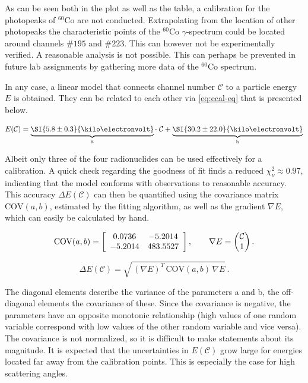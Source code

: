 

As can be seen both in the plot as well as the table, a calibration for the
photopeaks of $^{60}$Co are not conducted. Extrapolating from the location of other 
photopeaks the characteristic points of the $^{60}$Co $\gamma$-spectrum could be 
located around channels $\#195$ and $\#223$. This can however not be experimentally 
verified. A reasonable analysis is not possible. This can perhaps be prevented in
future lab assignments by gathering more data of the $^{60}$Co spectrum.

In any case, a linear model that connects channel number $\mathcal{C}$ to a particle
energy $E$ is obtained. They can be related to each other via \autoref{eq:ecal-eq}
that is presented below.

\begin{equation}
\label{eq:ecal-eq}
	E(\mathcal{C}) = \underbrace{\SI{5.8\pm0.3}{\kilo\electronvolt}}_\text{a}\cdot\;\mathcal{C} + \underbrace{\SI{30.2\pm22.0}{\kilo\electronvolt}}_\text{b}
\end{equation}

Albeit only three of the four radionuclides can be used effectively for a
calibration. A quick check regarding the
goodness of fit finds a reduced $\chi^{2}_\nu\approx0.97$, indicating that the model
conforms with observations to reasonable accuracy. This accuracy $\Delta E
(\mathcal{C})$ can then be quantified using the covariance matrix $\text{COV}(a,b)$,
estimated by the fitting algorithm, as well as the gradient $\nabla E$, which can
easily be calculated by hand.


\begin{equation*}
	\text{COV}(a,b) =
	\left[
	\begin{array}{c c}
	0.0736 & -5.2014 \\
	-5.2014 & 483.5527
	\end{array}
	\right],
	\qquad\nabla E = \begin{pmatrix}\mathcal{C}\\1\end{pmatrix}.
\end{equation*}

\begin{equation}
\label{eq:energy-error}
	\Delta E(\mathcal{C}) = \sqrt{\,(\nabla E)^{T}\,\text{COV}(a,b)\,\nabla E}\,.
\end{equation}

The diagonal elements describe the variance of the parameters a and b, the off-diagonal elements the covariance of these.
Since the covariance is negative, the parameters have an opposite monotonic relationship 
(high values of one random variable correspond with low values of the other random variable and vice versa).
The covariance is not normalized, so it is difficult to make statements about its magnitude.
It is expected that the uncertainties in $E(\mathcal{C})$ grow large for energies
located far away from the calibration points. This is especially the case for high
scattering angles.
